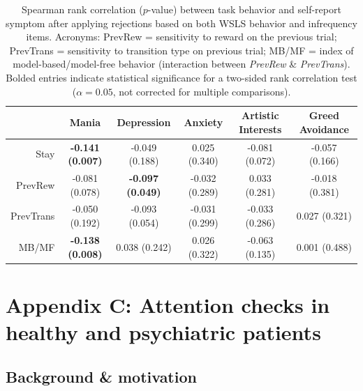 \documentclass[a4paper,notitlepage,12pt]{article}
\begin{document}
\begin{table}[H]
    \centering
    \begin{adjustbox}{center}   
    \small
    \begin{tabular}{rccccc}
        \toprule
        {} & Mania & Depression & Anxiety & Artistic Interests & Greed Avoidance \\
        \midrule
        Stay      &  \textbf{-0.141 (0.007)} &           -0.049 (0.188) &   0.025 (0.340) &  -0.081 (0.072) &  -0.057 (0.166) \\
        PrevRew   &           -0.081 (0.078) &  \textbf{-0.097 (0.049)} &  -0.032 (0.289) &   0.033 (0.281) &  -0.018 (0.381) \\
        PrevTrans &           -0.050 (0.192) &           -0.093 (0.054) &  -0.031 (0.299) &  -0.033 (0.286) &   0.027 (0.321) \\
        MB/MF     &  \textbf{-0.138 (0.008)} &            0.038 (0.242) &   0.026 (0.322) &  -0.063 (0.135) &   0.001 (0.488) \\
        \bottomrule
    \end{tabular}
    \end{adjustbox}
    \caption{Spearman rank correlation ($p$-value) between task behavior and self-report symptom after applying rejections based on both WSLS behavior and infrequency items. Acronyms: PrevRew = sensitivity to reward on the previous trial; PrevTrans = sensitivity to transition type on previous trial; MB/MF = index of model-based/model-free behavior (interaction between \textit{PrevRew} \& \textit{PrevTrans}). Bolded entries indicate statistical significance for a two-sided rank correlation test ($\alpha = 0.05$, not corrected for multiple comparisons).}
\end{table}

\break
\section*{Appendix C: Attention checks in healthy and psychiatric patients}

\subsection*{Background \& motivation}
\end{document}
